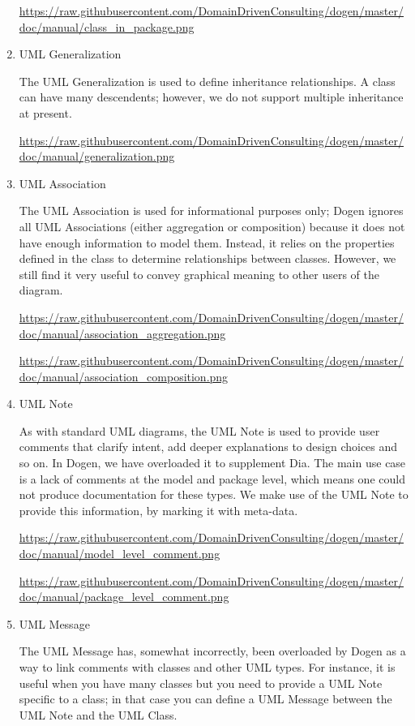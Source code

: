 \documentclass[11pt]{article}
\begin{document}
\begin{enumerate}
\url{https://raw.githubusercontent.com/DomainDrivenConsulting/dogen/master/doc/manual/class_in_package.png}

\item UML Generalization
\label{sec-3-4-2-3}

The UML Generalization is used to define inheritance relationships. A
class can have many descendents; however, we do not support multiple
inheritance at present.

\url{https://raw.githubusercontent.com/DomainDrivenConsulting/dogen/master/doc/manual/generalization.png}

\item UML Association
\label{sec-3-4-2-4}

The UML Association is used for informational purposes only; Dogen
ignores all UML Associations (either aggregation or composition)
because it does not have enough information to model them. Instead, it
relies on the properties defined in the class to determine
relationships between classes. However, we still find it very useful
to convey graphical meaning to other users of the diagram.

\url{https://raw.githubusercontent.com/DomainDrivenConsulting/dogen/master/doc/manual/association_aggregation.png}

\url{https://raw.githubusercontent.com/DomainDrivenConsulting/dogen/master/doc/manual/association_composition.png}

\item UML Note
\label{sec-3-4-2-5}

As with standard UML diagrams, the UML Note is used to provide user
comments that clarify intent, add deeper explanations to design
choices and so on. In Dogen, we have overloaded it to supplement
Dia. The main use case is a lack of comments at the model and package
level, which means one could not produce documentation for these
types. We make use of the UML Note to provide this information, by
marking it with meta-data.

\url{https://raw.githubusercontent.com/DomainDrivenConsulting/dogen/master/doc/manual/model_level_comment.png}

\url{https://raw.githubusercontent.com/DomainDrivenConsulting/dogen/master/doc/manual/package_level_comment.png}

\item UML Message
\label{sec-3-4-2-6}

The UML Message has, somewhat incorrectly, been overloaded by Dogen as
a way to link comments with classes and other UML types. For instance,
it is useful when you have many classes but you need to provide a UML
Note specific to a class; in that case you can define a UML Message
between the UML Note and the UML Class.


\end{enumerate}
\end{document}
